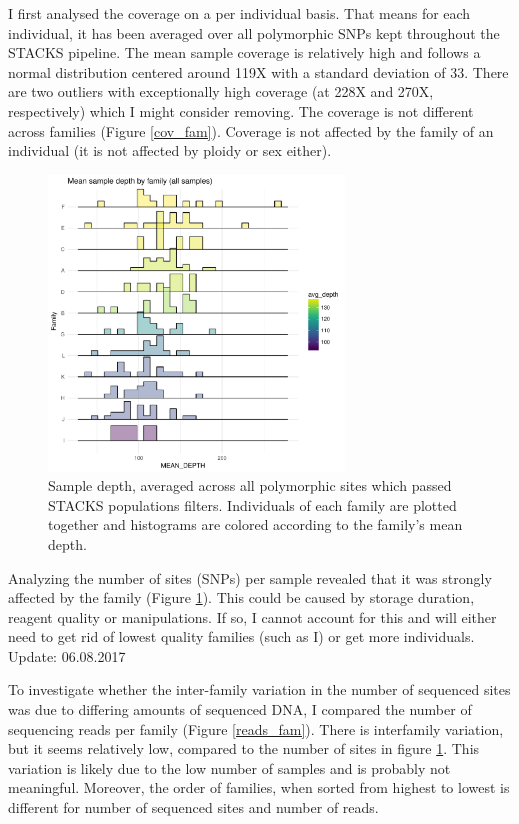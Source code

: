 \documentclass[10pt,a4paper]{report}
\begin{document}
I first analysed the coverage on a per individual basis. That means for each individual, it has been averaged over all polymorphic SNPs kept throughout the STACKS pipeline. The mean sample coverage is relatively high and follows a normal distribution centered around 119X with a standard deviation of 33. There are two outliers with exceptionally high coverage (at 228X and 270X, respectively) which I might consider removing. The coverage is not different across families (Figure \ref{cov_fam}). Coverage is not affected by the family of an individual (it is not affected by ploidy or sex either).

\begin{figure}[h]
	\begin{center}
		\includegraphics[width=0.70\textwidth]{coverage_analysis/cov_per_sample.pdf}
		\caption{Sample depth, averaged across all polymorphic sites which passed STACKS populations filters. Individuals of each family are plotted together and histograms are colored according to the family's mean depth.}
		\label{sites_fam}
	\end{center}
\end{figure}

Analyzing the number of sites (SNPs) per sample revealed that it was strongly affected by the family (Figure \ref{sites_fam}). This could be caused by storage duration, reagent quality or manipulations. If so, I cannot account for this and will either need to get rid of lowest quality families (such as I) or get more individuals.\\

Update: 06.08.2017

To investigate whether the inter-family variation in the number of sequenced sites was due to differing amounts of sequenced DNA, I compared the number of sequencing reads per family (Figure \ref{reads_fam}). There is interfamily variation, but it seems relatively low, compared to the number of sites in figure \ref{sites_fam}. This variation is likely due to the low number of samples and is probably not meaningful. Moreover, the order of families, when sorted from highest to lowest is different for number of sequenced sites and number of reads. 
\end{document}
